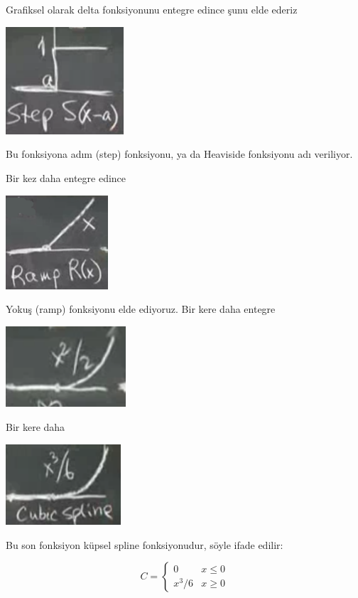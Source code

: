 \documentclass[12pt,fleqn]{article}\usepackage{../../common}
\begin{document}
Grafiksel olarak delta fonksiyonunu entegre edince şunu elde ederiz

\includegraphics[height=4cm]{4_3.png}

Bu fonksiyona adım (step) fonksiyonu, ya da Heaviside fonksiyonu adı
veriliyor. 

Bir kez daha entegre edince

\includegraphics[height=3.5cm]{4_4.png}

Yokuş (ramp) fonksiyonu elde ediyoruz. Bir kere daha entegre

\includegraphics[height=3.0cm]{4_5.png}

Bir kere daha

\includegraphics[height=3.0cm]{4_6.png}

Bu son fonksiyon küpsel spline fonksiyonudur, söyle ifade edilir:

$$ C = 
\left\{ \begin{array}{ll}
0 & x \le 0 \\
x^3 / 6 & x \ge 0
\end{array} \right.
 $$
\end{document}
